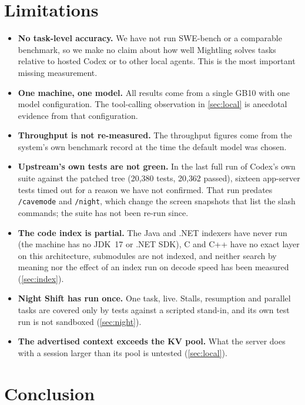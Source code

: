 \documentclass[11pt]{article}
\newcommand{\code}[1]{\texttt{#1}}
\begin{document}
\section{Limitations}
\label{sec:limits}

\begin{itemize}
  \item \textbf{No task-level accuracy.} We have not run SWE-bench or a comparable benchmark, so we
    make no claim about how well Mightling solves tasks relative to hosted Codex or to other local
    agents. This is the most important missing measurement.
  \item \textbf{One machine, one model.} All results come from a single GB10 with one model
    configuration. The tool-calling observation in \cref{sec:local} is anecdotal evidence from that
    configuration.
  \item \textbf{Throughput is not re-measured.} The throughput figures come from the system's own
    benchmark record at the time the default model was chosen.
  \item \textbf{Upstream's own tests are not green.} In the last full run of Codex's own suite
    against the patched tree (20{,}380 tests, 20{,}362 passed), sixteen app-server tests timed out
    for a reason we have not confirmed. That run predates \code{/cavemode} and \code{/night},
    which change the screen snapshots that list the slash commands; the suite has not been re-run
    since.
  \item \textbf{The code index is partial.} The Java and .NET indexers have never run (the machine
    has no JDK~17 or .NET SDK), C and C++ have no exact layer on this architecture, submodules are
    not indexed, and neither search by meaning nor the effect of an index run on decode speed has
    been measured (\cref{sec:index}).
  \item \textbf{Night Shift has run once.} One task, live. Stalls, resumption and parallel tasks
    are covered only by tests against a scripted stand-in, and its own test run is not sandboxed
    (\cref{sec:night}).
  \item \textbf{The advertised context exceeds the KV pool.} What the server does with a session
    larger than its pool is untested (\cref{sec:local}).
\end{itemize}

\section{Conclusion}
\end{document}
